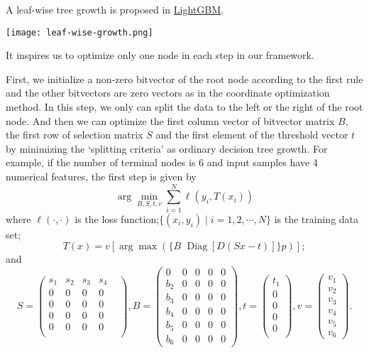 \documentclass[UTF8]{article}
\begin{document}
A leaf-wise tree growth is proposed  in
\href{https://papers.nips.cc/paper/6907-lightgbm-a-highly-efficient-gradient-boosting-decision-tree.pdf}{LightGBM}\cite{ke2017lightgbm:}.
\begin{center}
  \texttt{[image: leaf-wise-growth.png]}
\end{center}
It inspires us to optimize only one node in each step in our framework.

First, we initialize a non-zero bitvector of the root node according to the first rule
and the other bitvectors are zero vectors as in the coordinate optimization method.
In this step, we only can split the data to the left or the right of the root node.
And then we can optimize the first column vector of bitvector matrix $B$, the first row of selection matrix $S$
and the first element of the threshold vector $t$ by minimizing the `splitting criteria'
as ordinary decision tree growth.
For example, if the number of terminal nodes is $6$ and input samples have 4 numerical features,
the first step is given by
\begin{equation}\label{equa4}\arg\min_{B, S, t,v}\sum_{i=1}^{N}\ell(y_i, T(x_i))\end{equation}
where $\ell(\cdot,\cdot)$ is the loss function;$\{(x_i, y_i)\mid i=1,2,\cdots, N\}$ is the training data set;
$$T(x)=v[\arg\max(\{B\,\,\operatorname{Diag}[D(Sx-t)]\}p)];$$
and
$$
S=\begin{pmatrix}
s_1 & s_2 & s_3 & s_4 \\
0 & 0& 0& 0& \\
0 & 0& 0& 0& \\
0 & 0& 0& 0& \\
0 & 0& 0& 0& \\
\end{pmatrix},
B=
\begin{pmatrix}
0   & 0 & 0 & 0 & 0 \\
b_2 & 0 & 0 & 0 & 0 \\
b_3 & 0 & 0 & 0 & 0 \\
b_4 & 0 & 0 & 0 & 0 \\
b_5 & 0 & 0 & 0 & 0 \\
b_6 & 0 & 0 & 0 & 0
\end{pmatrix},
t=\begin{pmatrix}
t_1\\ 0\\ 0\\ 0\\ 0\\
\end{pmatrix},
v=\begin{pmatrix}
v_1\\ v_2\\ v_3\\ v_4\\ v_5\\ v_6
\end{pmatrix}.
$$
\end{document}
